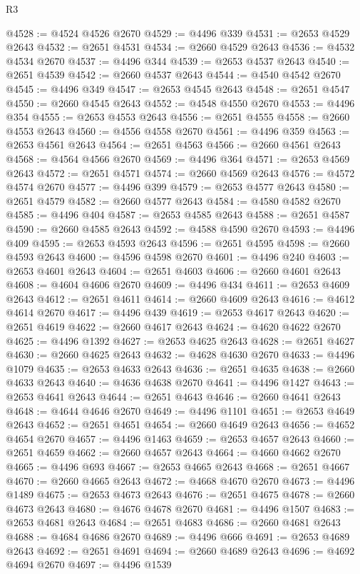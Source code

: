 \begin{lexlean}{R3}
\begin{coremodule}
@4528 := @4524 @4526 @2670
@4529 := @4496 @339
@4531 := @2653 @4529 @2643
@4532 := @2651 @4531
@4534 := @2660 @4529 @2643
@4536 := @4532 @4534 @2670
@4537 := @4496 @344
@4539 := @2653 @4537 @2643
@4540 := @2651 @4539
@4542 := @2660 @4537 @2643
@4544 := @4540 @4542 @2670
@4545 := @4496 @349
@4547 := @2653 @4545 @2643
@4548 := @2651 @4547
@4550 := @2660 @4545 @2643
@4552 := @4548 @4550 @2670
@4553 := @4496 @354
@4555 := @2653 @4553 @2643
@4556 := @2651 @4555
@4558 := @2660 @4553 @2643
@4560 := @4556 @4558 @2670
@4561 := @4496 @359
@4563 := @2653 @4561 @2643
@4564 := @2651 @4563
@4566 := @2660 @4561 @2643
@4568 := @4564 @4566 @2670
@4569 := @4496 @364
@4571 := @2653 @4569 @2643
@4572 := @2651 @4571
@4574 := @2660 @4569 @2643
@4576 := @4572 @4574 @2670
@4577 := @4496 @399
@4579 := @2653 @4577 @2643
@4580 := @2651 @4579
@4582 := @2660 @4577 @2643
@4584 := @4580 @4582 @2670
@4585 := @4496 @404
@4587 := @2653 @4585 @2643
@4588 := @2651 @4587
@4590 := @2660 @4585 @2643
@4592 := @4588 @4590 @2670
@4593 := @4496 @409
@4595 := @2653 @4593 @2643
@4596 := @2651 @4595
@4598 := @2660 @4593 @2643
@4600 := @4596 @4598 @2670
@4601 := @4496 @240
@4603 := @2653 @4601 @2643
@4604 := @2651 @4603
@4606 := @2660 @4601 @2643
@4608 := @4604 @4606 @2670
@4609 := @4496 @434
@4611 := @2653 @4609 @2643
@4612 := @2651 @4611
@4614 := @2660 @4609 @2643
@4616 := @4612 @4614 @2670
@4617 := @4496 @439
@4619 := @2653 @4617 @2643
@4620 := @2651 @4619
@4622 := @2660 @4617 @2643
@4624 := @4620 @4622 @2670
@4625 := @4496 @1392
@4627 := @2653 @4625 @2643
@4628 := @2651 @4627
@4630 := @2660 @4625 @2643
@4632 := @4628 @4630 @2670
@4633 := @4496 @1079
@4635 := @2653 @4633 @2643
@4636 := @2651 @4635
@4638 := @2660 @4633 @2643
@4640 := @4636 @4638 @2670
@4641 := @4496 @1427
@4643 := @2653 @4641 @2643
@4644 := @2651 @4643
@4646 := @2660 @4641 @2643
@4648 := @4644 @4646 @2670
@4649 := @4496 @1101
@4651 := @2653 @4649 @2643
@4652 := @2651 @4651
@4654 := @2660 @4649 @2643
@4656 := @4652 @4654 @2670
@4657 := @4496 @1463
@4659 := @2653 @4657 @2643
@4660 := @2651 @4659
@4662 := @2660 @4657 @2643
@4664 := @4660 @4662 @2670
@4665 := @4496 @693
@4667 := @2653 @4665 @2643
@4668 := @2651 @4667
@4670 := @2660 @4665 @2643
@4672 := @4668 @4670 @2670
@4673 := @4496 @1489
@4675 := @2653 @4673 @2643
@4676 := @2651 @4675
@4678 := @2660 @4673 @2643
@4680 := @4676 @4678 @2670
@4681 := @4496 @1507
@4683 := @2653 @4681 @2643
@4684 := @2651 @4683
@4686 := @2660 @4681 @2643
@4688 := @4684 @4686 @2670
@4689 := @4496 @666
@4691 := @2653 @4689 @2643
@4692 := @2651 @4691
@4694 := @2660 @4689 @2643
@4696 := @4692 @4694 @2670
@4697 := @4496 @1539

\end{coremodule}
\end{lexlean}
